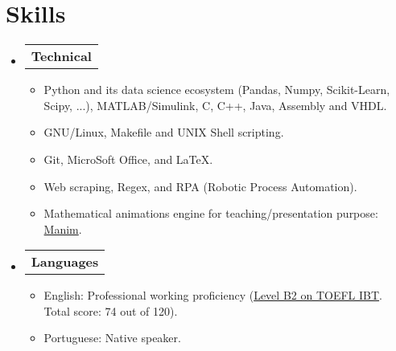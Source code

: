 \section{Skills}

\begin{itemize}[leftmargin=0.15in, label={}] %
  \item   \begin{tabular*}{0.2\textwidth}{l} \textbf{Technical} \end{tabular*}\vspace{-7pt} %
          \begin{itemize} %
            \item Python and its data science ecosystem (Pandas, Numpy, Scikit-Learn, Scipy, ...), MATLAB/Simulink, C, C++, Java, Assembly and VHDL. %
            \item GNU/Linux, Makefile and UNIX Shell scripting.
            \item Git, MicroSoft Office, and \LaTeX.
            \item Web scraping, Regex, and RPA (Robotic Process Automation).
            \item Mathematical animations engine for teaching/presentation purpose: \href{https://github.com/ManimCommunity/manim}{Manim}.
          \end{itemize}\vspace{-5pt}
  \item   \begin{tabular*}{0.2\textwidth}{l} \textbf{Languages} \end{tabular*}\vspace{-6pt} %
          \begin{itemize}
            \item English: Professional working proficiency (\href{http://raw.githubusercontent.com/tapyu/tapyu/master/cv/Latex/figs/Toefl.pdf}{Level B2 on TOEFL IBT}. Total score: 74 out of 120).
            \item Portuguese: Native speaker.
          \end{itemize}
\end{itemize} %